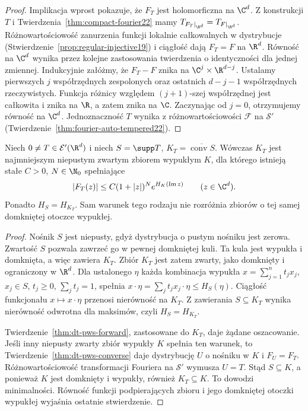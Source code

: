 \begin{proof}
Implikacja wprost pokazuje, że $F_T$ jest holomorficzna
na $\C^d$. Z konstrukcji $T$ i
Twierdzenia~\ref{thm:compact-fourier22}
mamy $T_{F_T|_{\R^d}}=T_{F|_{\R^d}}$.
Różnowartościowość zanurzenia funkcji lokalnie
całkowalnych w dystrybucje
(Stwierdzenie~\ref{prop:regular-injective19})
i ciągłość dają $F_T=F$ na $\R^d$.
Równość na $\C^d$ wynika przez kolejne zastosowania
twierdzenia o identyczności dla jednej zmiennej.
Indukcyjnie załóżmy, że $F_T-F$ znika na
$\C^j\times\R^{d-j}$. Ustalamy pierwszych $j$
współrzędnych zespolonych oraz ostatnich $d-j-1$
współrzędnych rzeczywistych. Funkcja różnicy
względem $(j+1)$-szej współrzędnej jest całkowita
i znika na $\R$, a zatem znika na $\C$.
Zaczynając od $j=0$, otrzymujemy równość na $\C^d$. Jednoznaczność $T$ wynika z
różnowartościowości $\mathcal F$ na $\mathcal S'$
(Twierdzenie~\ref{thm:fourier-auto-tempered22}).
\end{proof}

\begin{wniosek}
\label{cor:dt-pws-convex-hull}
Niech $0\ne T\in\mathcal E'(\R^d)$ i niech
$S=\supp T$, $K_T=\overline{\operatorname{conv}S}$.
Wówczas $K_T$ jest najmniejszym niepustym zwartym
zbiorem wypukłym $K$, dla którego istnieją stałe
$C>0$, $N\in\N_0$ spełniające
\[
 |F_T(z)|\le C(1+|z|)^N e^{H_K(\operatorname{Im}z)}
 \qquad(z\in\C^d).
\]
Ponadto $H_S=H_{K_T}$. Sam warunek tego rodzaju
nie rozróżnia zbiorów o tej samej domkniętej otoczce
wypukłej.
\end{wniosek}
\begin{proof}
Nośnik $S$ jest niepusty, gdyż dystrybucja o pustym
nośniku jest zerowa. Zwartość $S$ pozwala zawrzeć go
w pewnej domkniętej kuli. Ta kula jest wypukła
i domknięta, a więc zawiera $K_T$. Zbiór $K_T$ jest
zatem zwarty, jako domknięty i ograniczony w $\R^d$.
Dla ustalonego $\eta$ każda kombinacja wypukła
$x=\sum_{j=1}^n t_jx_j$, $x_j\in S$, $t_j\ge0$,
$\sum_j t_j=1$, spełnia
$x\cdot\eta=\sum_jt_jx_j\cdot\eta\le H_S(\eta)$.
Ciągłość funkcjonału $x\mapsto x\cdot\eta$ przenosi
nierówność na $K_T$. Z zawierania $S\subseteq K_T$
wynika nierówność odwrotna dla maksimów,
czyli $H_S=H_{K_T}$.

Twierdzenie~\ref{thm:dt-pws-forward}, zastosowane
do $K_T$, daje żądane oszacowanie. Jeśli inny
niepusty zwarty zbiór wypukły $K$ spełnia ten warunek,
to Twierdzenie~\ref{thm:dt-pws-converse} daje
dystrybucję $U$ o nośniku w $K$ i $F_U=F_T$.
Różnowartościowość transformacji Fouriera na
$\mathcal S'$ wymusza $U=T$. Stąd $S\subseteq K$,
a ponieważ $K$ jest domknięty i wypukły,
również $K_T\subseteq K$. To dowodzi minimalności.
Równość funkcji podpierających zbioru i jego
domkniętej otoczki wypukłej wyjaśnia ostatnie
stwierdzenie.
\end{proof}

